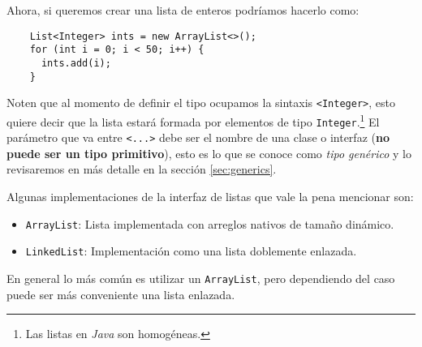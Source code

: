   Ahora, si queremos crear una lista de enteros podríamos hacerlo como:
  \begin{verbatim}
    List<Integer> ints = new ArrayList<>();
    for (int i = 0; i < 50; i++) {
      ints.add(i);
    }
  \end{verbatim}

  Noten que al momento de definir el tipo ocupamos la sintaxis \texttt{<Integer>}, esto quiere 
  decir que la lista estará formada por elementos de tipo \texttt{Integer}.\footnote{Las 
  listas en \textit{Java} son homogéneas.}
  El parámetro que va entre \texttt{<...>} debe ser el nombre de una clase o interfaz (\textbf{no 
  puede ser un tipo primitivo}), esto es lo que se conoce como \textit{tipo genérico} y lo 
  revisaremos en más detalle en la sección \ref{sec:generics}.

  Algunas implementaciones de la interfaz de listas que vale la pena mencionar son:
  \begin{itemize}
    \item \texttt{ArrayList}: Lista implementada con arreglos nativos de tamaño dinámico.
    \item \texttt{LinkedList}: Implementación como una lista doblemente enlazada.
  \end{itemize}

  En general lo más común es utilizar un \texttt{ArrayList}, pero dependiendo del caso puede ser
  más conveniente una lista enlazada.\autocite{so-linked-vs-array}
